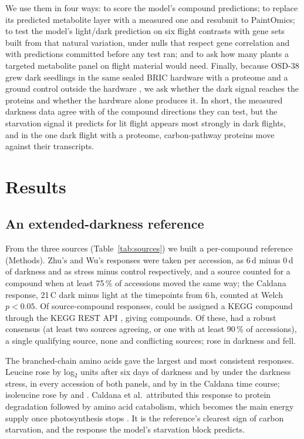 \documentclass{npjlayout}
\begin{document}
We use them in four ways: to score the model's compound predictions; to replace its predicted
metabolite layer with a measured one and resubmit to PaintOmics; to test the model's light/dark
prediction on six flight contrasts with gene sets built from that natural variation, under nulls
that respect gene correlation and with predictions committed before any test ran; and to ask how
many plants a targeted metabolite panel on flight material would need. Finally, because OSD-38
\citep{osd38} grew dark seedlings in the same sealed BRIC hardware with a proteome
\citep{kruse2020} and a ground control outside the hardware \citep{basu2017}, we ask whether the
dark signal reaches the proteins and whether the hardware alone produces it. In short, the measured
darkness data agree with \nModelAgree{} of the \nComparable{} compound directions they can test, but the
starvation signal it predicts for lit flight appears most strongly in dark flights, and in the one
dark flight with a proteome, carbon-pathway proteins move against their transcripts.

\section{Results}\label{sec:results}

\subsection{An extended-darkness reference}

From the three sources (Table~\ref{tab:sources}) we built a per-compound reference (Methods). Zhu's
and Wu's responses were taken per accession, as 6\,d minus 0\,d of darkness and as stress minus
control respectively, and a source counted for a compound when at least 75\,\% of accessions moved
the same way; the Caldana response, 21\,\textdegree C dark minus light at the timepoints from 6\,h,
counted at Welch $p<0.05$. Of \nSourceRows{} source-compound responses, \nSourceKegg{} could be assigned a KEGG
compound through the KEGG REST API \citep{kanehisa2000,keggrest}, giving \nRefCompounds{} compounds.
Of these, \nRefRobust{} had a robust consensus (at least two sources agreeing, or one with at least 90\,\%
of accessions), \nRefSingle{} a single qualifying source, \nRefNone{} none and \nRefConflicting{}
conflicting sources; \nRefUp{} rose in darkness and \nRefDown{} fell.

The branched-chain amino acids gave the largest and most consistent responses. Leucine rose by
\leuZhu{} log$_2$ units after six days of darkness and by \leuWu{} under the darkness stress, in
every accession of both panels, and by \leuCaldana{} in the Caldana time course; isoleucine rose by
\ileZhu{} and \ileWu{}. Caldana et al.\ attributed this response to protein degradation followed by
amino acid catabolism, which becomes the main energy supply once photosynthesis stops
\citep{caldana2011}. It is the reference's clearest sign of carbon starvation, and the response the
model's starvation block predicts.
\end{document}
